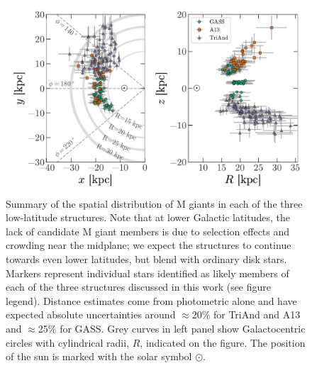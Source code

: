 \documentclass[galaxies,article,submit,moreauthors,pdftex,10pt,a4paper]{mdpi}
\newcommand{\survey}[1]{\textsl{#1}}
\begin{document}

\begin{figure}[!ht]
\label{fig:ting}
\centering
\includegraphics[width=6 in]{figures/xy_Rz.pdf}
\caption{\label{fig:ting}
Summary of the spatial distribution of M giants in each of the three
low-latitude structures.
Note that at lower Galactic latitudes, the lack of candidate M giant members is
due to selection effects and crowding near the midplane; we expect the
structures to continue towards even lower latitudes, but blend with ordinary
disk stars.
Markers represent individual stars identified as likely members of each of the
three structures discussed in this work (see figure legend).
Distance estimates come from photometric alone and have expected absolute
uncertainties around $\approx$20\% for TriAnd and A13 \cite{sheffield14,li17}
and $\approx$25\% for GASS.
Grey curves in left panel show Galactocentric circles with cylindrical radii,
$R$, indicated on the figure.
The position of the sun is marked with the solar symbol $\odot$.
}
\end{figure}
\end{document}
